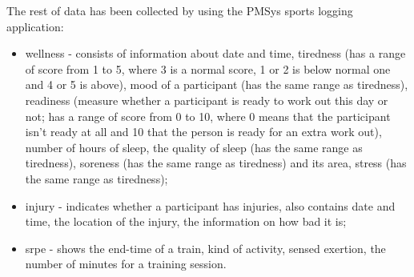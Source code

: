 The rest of data has been collected by using the PMSys sports logging application:
\begin{itemize}
    \item wellness - consists of information about date and time, tiredness (has a range of score from 1 to 5, where 3 is a normal score, 1 or 2 is below normal one and 4 or 5 is above), mood of a participant (has the same range as tiredness), readiness (measure whether a participant is ready to work out this day or not; has a range of score from 0 to 10, where 0 means that the participant isn't ready at all and 10 that the person is ready for an extra work out), number of hours of sleep, the quality of sleep (has the same range as tiredness), soreness (has the same range as tiredness) and its area, stress (has the same range as tiredness);
    \item injury - indicates whether a participant has injuries, also contains date and time, the location of the injury, the information on how bad it is;
    \item srpe - shows the end-time of a train, kind of activity, sensed exertion, the number of minutes for a training session.
\end{itemize}